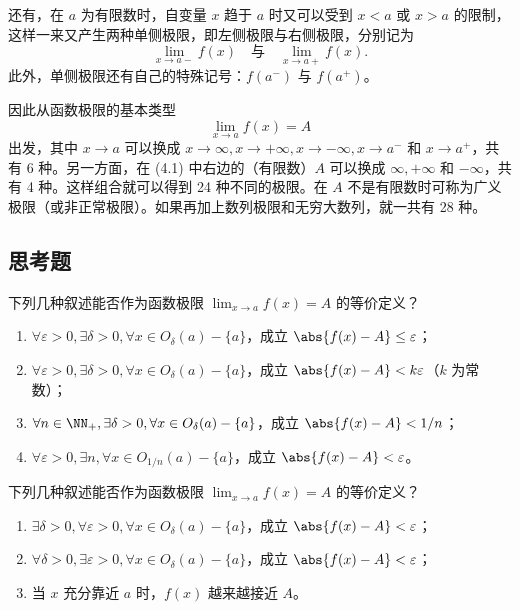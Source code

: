 还有，在 $a$ 为有限数时，自变量 $x$ 趋于 $a$ 时又可以受到 $x<a$ 或 $x>a$ 的限制，这样一来又产生两种单侧极限，即左侧极限与右侧极限，分别记为
\[
  \lim_{x\to a-}f(x)\quad\text{与}\quad\lim_{x\to a+}f(x).
\]
此外，单侧极限还有自己的特殊记号：$f(a^-)$ 与 $f(a^+)$。

因此从函数极限的基本类型
\begin{equation}
  \lim_{x\to a}f(x)=A
  \tag{4.1}
  \label{eq:4.1}
\end{equation}
出发，其中 $x\to a$ 可以换成 $x\to\infty,x\to+\infty,x\to-\infty,x\to a^-$ 和 $x\to a^+$，共有 6 种。另一方面，在 (4.1) 中右边的（有限数）$A$ 可以换成 $\infty,+\infty$ 和 $-\infty$，共有 4 种。这样组合就可以得到 24 种不同的极限。在 $A$ 不是有限数时可称为广义极限（或非正常极限）。如果再加上数列极限和无穷大数列，就一共有 28 种。

\subsection{思考题}

\begin{xthought}[1]
下列几种叙述能否作为函数极限 $\lim_{x\to a}f(x)=A$ 的等价定义？
  \begin{enumerate}[label=(\arabic*)]
    \item $\forall\varepsilon>0,\exists\delta>0,\forall x\in O_\delta(a)-\{a\}$，成立 $\abs{f(x)-A}\leq\varepsilon$；
    \item $\forall\varepsilon>0,\exists\delta>0,\forall x\in O_\delta(a)-\{a\}$，成立 $\abs{f(x)-A}<k\varepsilon$（$k$ 为常数）；
    \item $\forall n\in\NN_+,\exists\delta>0,\forall x\in O_\delta(a)-\{a\}$，成立 $\abs{f(x)-A}<1/n$；
    \item $\forall\varepsilon>0,\exists n,\forall x\in O_{1/n}(a)-\{a\}$，成立 $\abs{f(x)-A}<\varepsilon$。
  \end{enumerate}
\end{xthought}

\begin{xthought}[2]
下列几种叙述能否作为函数极限 $\lim_{x\to a}f(x)=A$ 的等价定义？
  \begin{enumerate}[label=(\arabic*)]
    \item $\exists\delta>0,\forall\varepsilon>0,\forall x\in O_\delta(a)-\{a\}$，成立 $\abs{f(x)-A}<\varepsilon$；
    \item $\forall\delta>0,\exists\varepsilon>0,\forall x\in O_\delta(a)-\{a\}$，成立 $\abs{f(x)-A}<\varepsilon$；
    \item 当 $x$ 充分靠近 $a$ 时，$f(x)$ 越来越接近 $A$。
  \end{enumerate}
\end{xthought}

